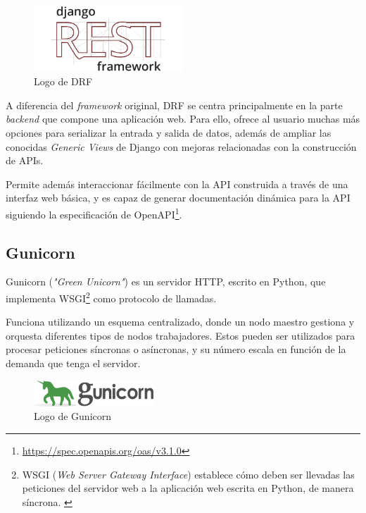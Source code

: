 \begin{figure}[ht]
    \centering
    \includegraphics[width=0.5\textwidth]{Figures/drf-logo}
    \decoRule
    \caption[DRF (Logo)]{Logo de DRF \emph{\parencite{Reference8}}}
    \label{fig:drf-logo}
\end{figure}

A diferencia del \emph{framework} original, DRF se centra principalmente en la parte \emph{backend} que compone una aplicación web. Para ello, ofrece al usuario muchas más opciones para serializar la entrada y salida de datos, además de ampliar las conocidas \emph{Generic Views} de Django con mejoras relacionadas con la construcción de APIs. \emph{\parencite{Reference7}}

Permite además interaccionar fácilmente con la API construida a través de una interfaz web básica, y es capaz de generar documentación dinámica para la API siguiendo la especificación de OpenAPI\footnote{\url{https://spec.openapis.org/oas/v3.1.0}}. \emph{\parencite{Reference7}}

\subsection{Gunicorn}\label{sec:gunicorn}

Gunicorn (\emph{"Green Unicorn"}) es un servidor HTTP, escrito en Python, que implementa WSGI\footnote{WSGI (\emph{Web Server Gateway Interface}) establece cómo deben ser llevadas las peticiones del servidor web a la aplicación web escrita en Python, de manera síncrona. \emph{\parencite{Reference11}}} como protocolo de llamadas.

Funciona utilizando un esquema centralizado, donde un nodo maestro gestiona y orquesta diferentes tipos de nodos trabajadores. Estos pueden ser utilizados para procesar peticiones síncronas o asíncronas, y su número escala en función de la demanda que tenga el servidor. \emph{\parencite{Reference9}}

\begin{figure}[ht]
    \centering
    \includegraphics[width=0.4\textwidth]{Figures/gunicorn-logo}
    \decoRule
    \caption[Gunicorn (Logo)]{Logo de Gunicorn \emph{\parencite{Reference10}}}
    \label{fig:gunicorn-logo}
\end{figure}


